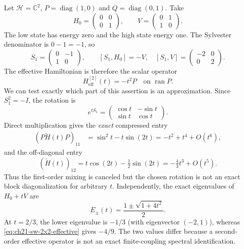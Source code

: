\begin{example}
\label{ex:ch21-sw-two-level}
Let $\mathcal H=\mathbb C^2$, $P=\operatorname{diag}(1,0)$ and
$Q=\operatorname{diag}(0,1)$.  Take
\begin{equation}
 H_0=\begin{pmatrix}0&0\\0&1\end{pmatrix},\qquad
 V=\begin{pmatrix}0&1\\1&0\end{pmatrix}.
\label{eq:ch21-sw-2x2-input}
\end{equation}
The low state has energy zero and the high state energy one.  The
Sylvester denominator is $0-1=-1$, so
\begin{equation}
 S_1=\begin{pmatrix}0&-1\\1&0\end{pmatrix},\qquad
 [S_1,H_0]=-V,
 \quad[S_1,V]=\begin{pmatrix}-2&0\\0&2\end{pmatrix}.
\label{eq:ch21-sw-2x2-generator}
\end{equation}
The effective Hamiltonian is therefore the scalar operator
\begin{equation}
 H_{\mathrm{eff}}^{[2]}(t)=-t^2 P
 \quad\text{on }\operatorname{ran}P.
\label{eq:ch21-sw-2x2-effective}
\end{equation}
We can test exactly which part of this assertion is an approximation.
Since $S_1^2=-I$, the rotation is
\begin{equation}
 e^{tS_1}=\begin{pmatrix}\cos t&-\sin t\\
                                   \sin t&\cos t\end{pmatrix}.
\end{equation}
Direct multiplication gives the \emph{exact} compressed entry
\begin{align}
 (P\widetilde H(t)P)_{11}
 &=\sin^2t-t\sin(2t)
   =-t^2+t^4+O(t^6),
\label{eq:ch21-sw-2x2-rotated}\end{align}
and the off-diagonal entry
\begin{equation}
 (\widetilde H(t))_{12}
 =t\cos(2t)-\tfrac12\sin(2t)
 =-\tfrac43t^3+O(t^5).
\label{eq:ch21-sw-2x2-off}
\end{equation}
Thus the first-order mixing is canceled but the chosen rotation is
not an exact block diagonalization for arbitrary $t$.  Independently,
the exact eigenvalues of $H_0+tV$ are
\begin{equation}
 E_\pm(t)=\frac{1\pm\sqrt{1+4t^2}}2.
\label{eq:ch21-sw-2x2-eigvals}
\end{equation}
At $t=2/3$, the lower eigenvalue is $-1/3$ (with eigenvector
$(-2,1)$), whereas \eqref{eq:ch21-sw-2x2-effective} gives $-4/9$.
The two values differ because a second-order effective operator is
not an exact finite-coupling spectral identification.
\end{example}

